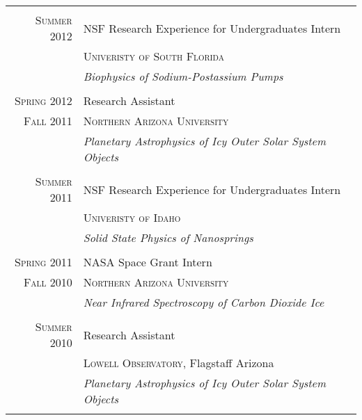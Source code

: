 \documentclass[letterpaper,10pt]{article} %
\begin{document}
\begin{tabular}{r|p{11cm}}
\multicolumn{2}{c}{} \\


\textsc{Summer 2012} & NSF Research Experience for Undergraduates Intern \\
 & \textsc{Univeristy of South Florida} \\

&\emph{Biophysics of Sodium-Postassium Pumps}\\ 

\multicolumn{2}{c}{} \\


\textsc{Spring 2012} & Research Assistant \\
\textsc{Fall 2011} & \textsc{Northern Arizona University} \\
&\emph{Planetary Astrophysics of Icy Outer Solar System Objects}\\ 

\multicolumn{2}{c}{} \\


\textsc{Summer 2011} & NSF Research Experience for Undergraduates Intern \\
& \textsc{Univeristy of Idaho} \\

&\emph{Solid State Physics of Nanosprings}\\ 

\multicolumn{2}{c}{} \\


\textsc{Spring 2011} & NASA Space Grant Intern\\
\textsc{Fall 2010} & \textsc{Northern Arizona University} \\
&\emph{Near Infrared Spectroscopy of Carbon Dioxide Ice}\\ 

\multicolumn{2}{c}{} \\


\textsc{Summer 2010} & Research Assistant \\
& \textsc{Lowell Observatory}, Flagstaff Arizona \\
&\emph{Planetary Astrophysics of Icy Outer Solar System Objects}\\ 

\multicolumn{2}{c}{} \\


\end{tabular}
\end{document}
